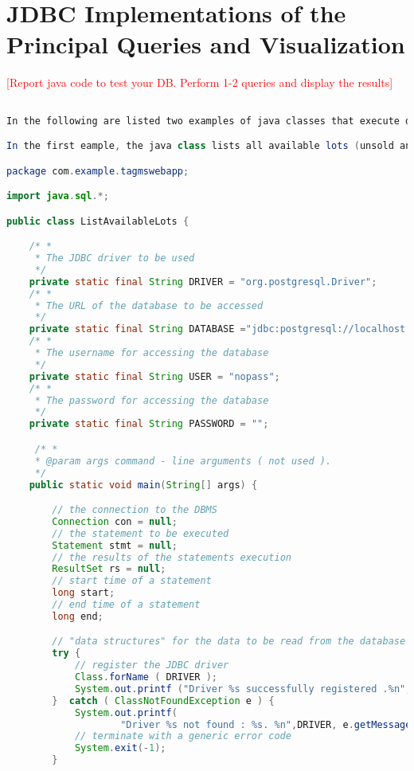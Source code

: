\section{JDBC Implementations of the Principal Queries and Visualization}
\textcolor{red}{[Report java code to test your DB. Perform 1-2 queries and display the results]}

\begin{lstlisting}[language=JAVA,
commentstyle = \color{gray},
keywordstyle = \color{blue}, 
stringstyle = \color{ForestGreen}, 
rulecolor = \color{black},
breaklines=true,
basicstyle=\ttfamily\footnotesize,
showstringspaces=false]

In the following are listed two examples of java classes that execute different INSERT.

In the first eample, the java class lists all available lots (unsold and that won't expire in 6 months) containing a particular product having a given Product_id as identifier, sorted by expiration date (oldest lots must be sold first).

package com.example.tagmswebapp;

import java.sql.*;

public class ListAvailableLots {

    /* *
     * The JDBC driver to be used
     */
    private static final String DRIVER = "org.postgresql.Driver";
    /* *
     * The URL of the database to be accessed
     */
    private static final String DATABASE ="jdbc:postgresql://localhost:5432/tagmsdb";
    /* *
     * The username for accessing the database
     */
    private static final String USER = "nopass";
    /* *
     * The password for accessing the database
     */
    private static final String PASSWORD = "";

     /* *
     * @param args command - line arguments ( not used ).
     */
    public static void main(String[] args) {

        // the connection to the DBMS
        Connection con = null;
        // the statement to be executed
        Statement stmt = null;
        // the results of the statements execution
        ResultSet rs = null;
        // start time of a statement
        long start;
        // end time of a statement
        long end;

        // "data structures" for the data to be read from the database
        try {
            // register the JDBC driver
            Class.forName ( DRIVER );
            System.out.printf ("Driver %s successfully registered .%n", DRIVER );
        }  catch ( ClassNotFoundException e ) {
            System.out.printf(
                    "Driver %s not found : %s. %n",DRIVER, e.getMessage());
            // terminate with a generic error code
            System.exit(-1);
        }


\end{lstlisting}
